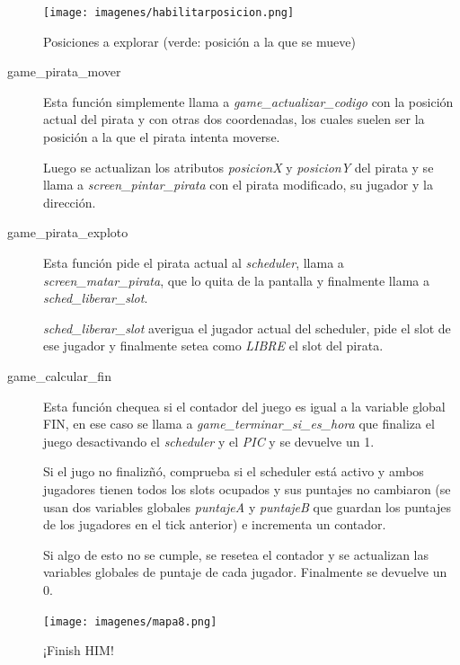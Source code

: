 \begin{description}
\begin{center}
\texttt{[image: imagenes/habilitarposicion.png]}

Posiciones a explorar (verde: posición a la que se mueve)
\end{center}


\item[game_pirata_mover]
  Esta función simplemente llama a {\it game_actualizar_codigo\/} con la
  posición actual del pirata y con otras dos coordenadas, los cuales suelen ser la
  posición a la que el pirata intenta moverse.

  Luego se actualizan los atributos {\it posicionX\/} y {\it posicionY\/} del
  pirata y se llama a {\it screen_pintar_pirata\/} con el pirata modificado, su
  jugador y la dirección.

\item[game_pirata_exploto]
  Esta función pide el pirata actual al {\it scheduler\/}, llama a
  {\it screen_matar_pirata\/}, que lo quita de la pantalla y finalmente llama a
  {\it sched_liberar_slot\/}.

  {\it sched_liberar_slot\/} averigua el jugador actual del scheduler, pide el
  slot de ese jugador y finalmente setea como {\it LIBRE\/} el slot del pirata.

\item[game_calcular_fin]
  Esta función chequea si el contador del juego es igual a la variable global
  FIN, en ese caso se llama a {\it game_terminar_si_es_hora\/} que finaliza el
  juego desactivando el {\it scheduler\/} y el {\it PIC\/} y se devuelve un 1.

  Si el jugo no finalizñó, comprueba si el scheduler está activo y ambos
  jugadores tienen todos los slots ocupados y sus puntajes no cambiaron
  (se usan dos variables globales {\it puntajeA\/} y {\it puntajeB\/} que guardan
  los puntajes de los jugadores en el tick anterior) e incrementa un contador.

  Si algo de esto no se cumple, se resetea el contador y se actualizan las
  variables globales de puntaje de cada jugador. Finalmente se devuelve un 0.

  \begin{center}
  \texttt{[image: imagenes/mapa8.png]}

  ¡Finish HIM!
  \end{center}

\end{description}
